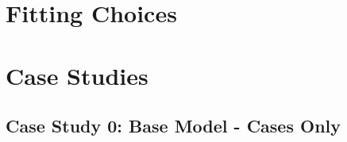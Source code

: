 \documentclass{article}
\begin{document}

\section{Fitting Choices}






\section{Case Studies}
\subsection{Case Study 0: Base Model - Cases Only}
\end{document}
